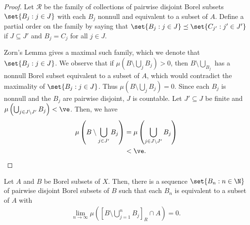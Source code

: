 \documentclass[10pt]{mypackage}
\begin{document}
\begin{proof}
  Let $\mathcal{R}$ be the family of collections of pairwise disjoint Borel subsets $\set{B_j : j\in J}$ with each $B_j$ nonnull and equivalent to a subset of $A$. Define a partial order on the family by saying that $\set{B_j : j\in J}\preceq \set{C_{j'} : j'\in J'}$ if $J\subseteq J'$ and $B_j = C_j$ for all $j\in J$.

  Zorn's Lemma gives a maximal such family, which we denote that $\set{B_j : j\in J}$. We observe that if $\mu\left( B\setminus \bigcup_{j}B_j \right) > 0$, then $B\setminus \bigcup_{B_j}$ has a nonnull Borel subset equivalent to a subset of $A$, which would contradict the maximality of $\set{B_j: j\in J}$. Thus $\mu\left( B\setminus \bigcup_{j}B_j \right) = 0$. Since each $B_j$ is nonnull and the $B_j$ are pairwise disjoint, $J$ is countable. Let $J'\subseteq J$ be finite and $\mu\left( \bigcup_{j\in J\setminus J'} B_j \right) < \ve$. Then, we have
  \begin{align*}
    \mu\left( B\setminus \bigcup_{j\in J'}B_j \right) &= \mu\left( \bigcup_{j\in J\setminus J'}B_j \right)\\
                                                      &< \ve.
  \end{align*}
\end{proof}
\begin{lemma}
  Let $A$ and $B$ be Borel subsets of $X$. Then, there is a sequence $\set{B_n : n\in \N}$ of pairwise disjoint Borel subsets of $B$ such that each $B_n$ is equivalent to a subset of $A$ with
  \begin{align*}
    \lim_{n\to\infty} \mu\left( \left[ B\setminus\bigcup_{j=1}^{n}B_j \right]_R\cap A \right) = 0.
  \end{align*}
\end{lemma}
\end{document}
